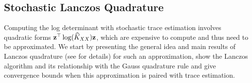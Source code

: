 \documentclass{article}
\begin{document}

\subsection{Stochastic Lanczos Quadrature} \label{sec:lanczos_quadrature}

Computing the log determinant with stochastic trace estimation involves  quadratic forms $\boldsymbol{\mathbf{z}}^\top \log(\widehat K_{XX}) \boldsymbol{\mathbf{z}}$, which are expensive to compute and thus need to be approximated. 
We start by presenting the general idea and main results of Lanczos quadrature (see \cite{golub_matrices_2010} for details) for such an approximation, show the Lanczos algorithm and its relationship with the Gauss quadrature rule and give convergence bounds when this approximation is paired with trace estimation. 
\end{document}
